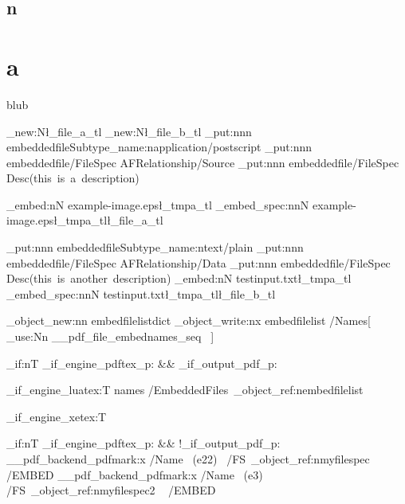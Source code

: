 \documentclass{article}
\begin{document}
\subsection{n}
\section{a}
blub
\ExplSyntaxOn


\tl_new:N\l_file_a_tl
\tl_new:N\l_file_b_tl
\pdfdict_put:nnn {embeddedfile}{Subtype}{\pdftool_name:n{application/postscript}}
\pdfdict_put:nnn {embeddedfile/FileSpec} {AFRelationship}{/Source}
\pdfdict_put:nnn {embeddedfile/FileSpec} {Desc}{(this~is~a~description)}

\pdffile_embed:nN       {example-image.eps}\l_tmpa_tl
\pdffile_embed_spec:nnN {example-image.eps}{\l_tmpa_tl}\l_file_a_tl

\pdfdict_put:nnn  {embeddedfile}{Subtype}{\pdftool_name:n{text/plain}}
\pdfdict_put:nnn       {embeddedfile/FileSpec} {AFRelationship}{/Data}
\pdfdict_put:nnn       {embeddedfile/FileSpec} {Desc}{(this~is~another~description)}
\pdffile_embed:nN       {testinput.txt}\l_tmpa_tl
\pdffile_embed_spec:nnN {testinput.txt}{\l_tmpa_tl}\l_file_b_tl



%
%

\pdf_object_new:nn {embedfilelist}{dict}
\pdf_object_write:nx {embedfilelist}
 {
  /Names[ \seq_use:Nn \g__pdf_file_embednames_seq {~}]
 }

\bool_if:nT {\sys_if_engine_pdftex_p: && \sys_if_output_pdf_p:}
 {
 }

\sys_if_engine_luatex:T
 {
   \pdfextension names {/EmbeddedFiles~\pdf_object_ref:n{embedfilelist} }
 }

\sys_if_engine_xetex:T
 {
 }

\bool_if:nT {\sys_if_engine_pdftex_p: && !\sys_if_output_pdf_p:}
 {
   \__pdf_backend_pdfmark:x
     {
       /Name~ (e22)~
       /FS~\pdf_object_ref:n{myfilespec}
       ~ /EMBED
   }
   \__pdf_backend_pdfmark:x
     {
       /Name~ (e3)~
       /FS~\pdf_object_ref:n{myfilespec2}
       ~ /EMBED
   }
  }



\ExplSyntaxOff
\end{document}
